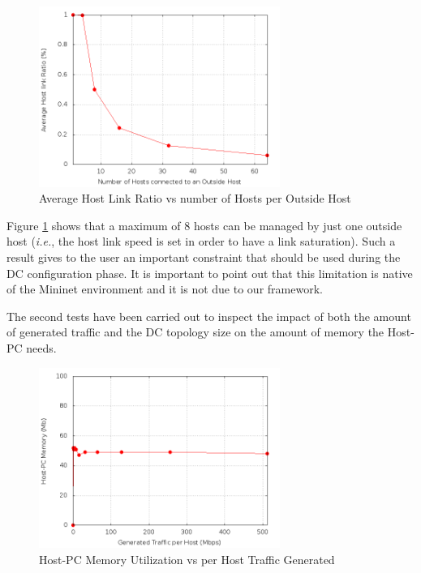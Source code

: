 \documentclass[12pt,english,oneside]{book}
\begin{document}
\begin{figure}[h!tbp]
        \centering
        \includegraphics[width=0.7\textwidth]{figures/out_hosts_ratio.png}
        \caption{Average Host Link Ratio vs number of Hosts per Outside Host}
        \label{fig:hosts}
\end{figure}

Figure \ref{fig:hosts} shows that a maximum of $8$ hosts can be managed by just one outside host (\textit{i.e.}, the host link speed is set in order to have a link saturation).
Such a result gives to the user an important constraint that should be used during the DC configuration phase.
It is important to point out that this limitation is native of the Mininet environment and it is not due to our framework.

The second tests have been carried out to inspect the impact of both the amount of generated traffic and the DC topology size on the amount of memory the Host-PC needs.

\newpage

\begin{figure}[h!tbp]
        \centering
        \includegraphics[width=0.7\textwidth]{figures/mem1_utilization.png}
        \caption{Host-PC Memory Utilization vs per Host Traffic Generated}
        \label{fig:mem1}
\end{figure}
\end{document}
